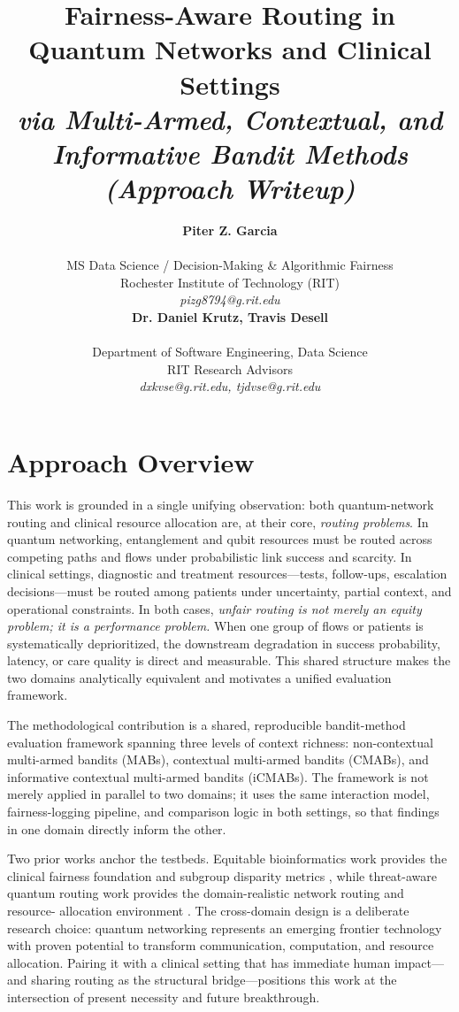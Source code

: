 \documentclass{IEEEtran}
\title{Fairness-Aware Routing in Quantum Networks and Clinical Settings\\[0.3em]
{\large\textit{via Multi-Armed, Contextual, and Informative Bandit Methods}}\\[0.3em]
{\large\textit{(Approach Writeup)}}}
\author{%
\begin{minipage}{0.48\textwidth}
\begin{center}
{\bf Piter Z. Garcia}\\
\begin{small}
MS Data Science / Decision-Making \& Algorithmic Fairness\\
Rochester Institute of Technology (RIT)\\
{\it pizg8794@g.rit.edu}
\end{small}
\end{center}
\end{minipage}
\hfill
\begin{minipage}{0.48\textwidth}
\begin{center}
{\bf Dr. Daniel Krutz, Travis Desell}\\
\begin{small}
Department of Software Engineering, Data Science\\
RIT Research Advisors\\
{\it dxkvse@g.rit.edu, tjdvse@g.rit.edu}
\end{small}
\end{center}
\end{minipage}%
}
\begin{document}
\maketitle

\section{Approach Overview}

This work is grounded in a single unifying observation: both quantum-network
routing and clinical resource allocation are, at their core, \textit{routing
problems}. In quantum networking, entanglement and qubit resources must be
routed across competing paths and flows under probabilistic link success and
scarcity. In clinical settings, diagnostic and treatment resources---tests,
follow-ups, escalation decisions---must be routed among patients under
uncertainty, partial context, and operational constraints. In both cases,
\textit{unfair routing is not merely an equity problem; it is a performance
problem.} When one group of flows or patients is systematically deprioritized,
the downstream degradation in success probability, latency, or care quality
is direct and measurable. This shared structure makes the two domains
analytically equivalent and motivates a unified evaluation framework.

The methodological contribution is a shared, reproducible bandit-method
evaluation framework spanning three levels of context richness:
non-contextual multi-armed bandits (MABs), contextual multi-armed bandits
(CMABs), and informative contextual multi-armed bandits (iCMABs). The
framework is not merely applied in parallel to two domains; it uses the same
interaction model, fairness-logging pipeline, and comparison logic in both
settings, so that findings in one domain directly inform the other.

Two prior works anchor the testbeds. Equitable bioinformatics work provides
the clinical fairness foundation and subgroup disparity metrics
\cite{garcia2025equitable_bioinformatics}, while threat-aware quantum
routing work provides the domain-realistic network routing and resource-
allocation environment \cite{garcia2026threat_aware_quantum_routing}. The
cross-domain design is a deliberate research choice: quantum networking
represents an emerging frontier technology with proven potential to
transform communication, computation, and resource allocation. Pairing it
with a clinical setting that has immediate human impact---and sharing routing
as the structural bridge---positions this work at the intersection of present
necessity and future breakthrough.
\end{document}
